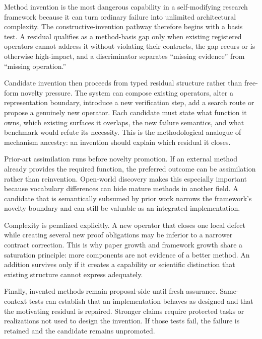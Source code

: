 Method invention is the most dangerous capability in a self-modifying research framework because it can turn ordinary failure into unlimited architectural complexity. The constructive-invention pathway therefore begins with a basis test. A residual qualifies as a method-basis gap only when existing registered operators cannot address it without violating their contracts, the gap recurs or is otherwise high-impact, and a discriminator separates ``missing evidence'' from ``missing operation.''

Candidate invention then proceeds from typed residual structure rather than free-form novelty pressure. The system can compose existing operators, alter a representation boundary, introduce a new verification step, add a search route or propose a genuinely new operator. Each candidate must state what function it owns, which existing surfaces it overlaps, the new failure semantics, and what benchmark would refute its necessity. This is the methodological analogue of mechanism ancestry: an invention should explain which residual it closes.

Prior-art assimilation runs before novelty promotion. If an external method already provides the required function, the preferred outcome can be assimilation rather than reinvention. Open-world discovery makes this especially important because vocabulary differences can hide mature methods in another field. A candidate that is semantically subsumed by prior work narrows the framework's novelty boundary and can still be valuable as an integrated implementation.

Complexity is penalized explicitly. A new operator that closes one local defect while creating several new proof obligations may be inferior to a narrower contract correction. This is why paper growth and framework growth share a saturation principle: more components are not evidence of a better method. An addition survives only if it creates a capability or scientific distinction that existing structure cannot express adequately.

Finally, invented methods remain proposal-side until fresh assurance. Same-context tests can establish that an implementation behaves as designed and that the motivating residual is repaired. Stronger claims require protected tasks or realizations not used to design the invention. If those tests fail, the failure is retained and the candidate remains unpromoted.

